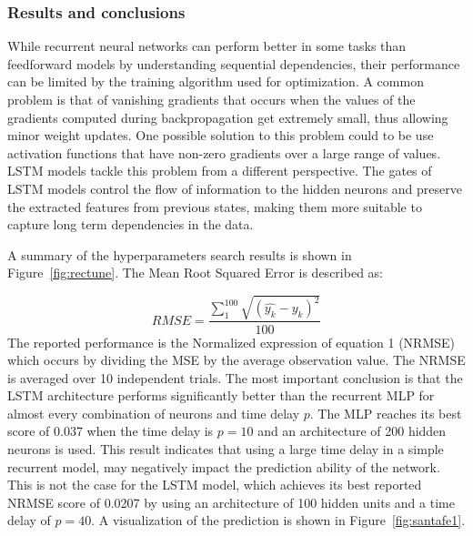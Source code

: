 \documentclass[conference,compsoc]{IEEEtran}
\begin{document}
 
  
\subsubsection{Results and conclusions}


 While recurrent neural networks can perform better in some tasks than feedforward models by understanding sequential dependencies, their performance can be limited by the training algorithm used for optimization. A common problem is that of vanishing gradients that occurs when the values of the gradients computed during backpropagation get extremely small, thus allowing minor weight updates. 
One possible solution to this problem could to be use activation functions that have non-zero gradients over a large range of values. LSTM models tackle this problem from a different perspective. The gates of LSTM models control the flow of information to the hidden neurons and preserve the extracted features from previous states, making them more suitable to capture long term dependencies in the data.

A summary of the hyperparameters search results is shown in Figure~\ref{fig:rectune}. The Mean Root Squared Error is described as:

\begin{equation}
 RMSE = \frac{  \sum_{1}^{100}  \sqrt{ (\hat{y_k}-y_k )^2 }}{100}
\end{equation} The reported performance is the Normalized expression of equation 1 (NRMSE) which occurs by dividing the MSE by the average observation value. The NRMSE is averaged over 10 independent trials. The most important conclusion is that the LSTM architecture performs significantly better than the recurrent MLP for almost every combination of neurons and time delay $p$. The MLP reaches its best score of 0.037 when the time delay is $p=10$ and an architecture of 200 hidden neurons is used. This result indicates that using a large time delay in a simple recurrent model, may negatively impact the prediction ability of the network. This is not the case for the LSTM model, which achieves its best reported NRMSE score of 0.0207 by using an architecture of 100 hidden units and a time delay of 
$p =40$. A visualization of the prediction is shown in Figure~\ref{fig:santafe1}.
\end{document}
